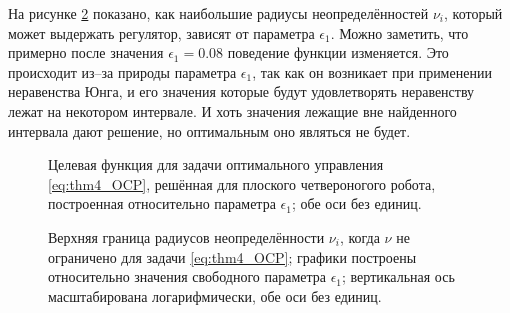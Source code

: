 На рисунке \ref{fig:mult_soft_nu} показано, как наибольшие радиусы неопределённостей $\nu_i$, который может выдержать регулятор, зависят от параметра $\epsilon_1$. Можно заметить, что примерно после значения $\epsilon_1 = 0.08$ поведение функции изменяется. Это происходит из--за природы параметра $\epsilon_1$, так как он возникает при применении неравенства Юнга, и его значения которые будут удовлетворять неравенству лежат на некотором интервале. И хоть значения лежащие вне найденного интервала дают решение, но оптимальным оно являться не будет. 

\begin{figure}[ht]
	\caption{Целевая функция для задачи оптимального управления \eqref{eq:thm4_OCP}, решённая для плоского четвероногого робота, построенная относительно параметра $\epsilon_1$; обе оси без единиц.} \label{fig:mult_soft_lin_cost}
\end{figure} 

\begin{figure}[ht]
	\caption{Верхняя граница радиусов неопределённости $\nu_i$, когда $\nu$ не ограничено для задачи \eqref{eq:thm4_OCP}; графики построены относительно значения свободного параметра $\epsilon_1$; вертикальная ось масштабирована логарифмически, обе оси без единиц.}\label{fig:mult_soft_nu}
\end{figure} 


